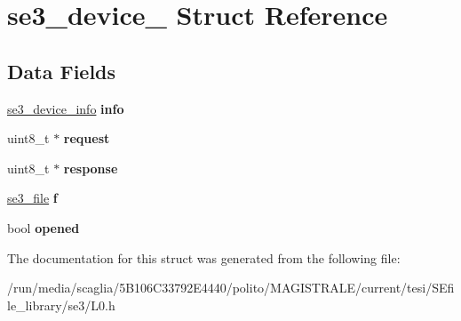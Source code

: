 \hypertarget{structse3__device__}{\section{se3\-\_\-device\-\_\- Struct Reference}
\label{structse3__device__}
}
\subsection*{Data Fields}
\begin{DoxyCompactItemize}
\item 
\hypertarget{structse3__device___acf59c445ad16d93a42ef4778d3cd9f5b}{\hyperlink{structse3__device__info__}{se3\-\_\-device\-\_\-info} {\bfseries info}}\label{structse3__device___acf59c445ad16d93a42ef4778d3cd9f5b}

\item 
\hypertarget{structse3__device___aaeb84a611ba0db8bc4731e53f9564b2e}{uint8\-\_\-t $\ast$ {\bfseries request}}\label{structse3__device___aaeb84a611ba0db8bc4731e53f9564b2e}

\item 
\hypertarget{structse3__device___a04f5fc8e98e6e4fa9577257495b9866d}{uint8\-\_\-t $\ast$ {\bfseries response}}\label{structse3__device___a04f5fc8e98e6e4fa9577257495b9866d}

\item 
\hypertarget{structse3__device___a36e8f9b6bafc4b5db5d8a18e67b6d088}{\hyperlink{structse3__file}{se3\-\_\-file} {\bfseries f}}\label{structse3__device___a36e8f9b6bafc4b5db5d8a18e67b6d088}

\item 
\hypertarget{structse3__device___abda2d2ee92f3f74961b5d2fae3017159}{bool {\bfseries opened}}\label{structse3__device___abda2d2ee92f3f74961b5d2fae3017159}

\end{DoxyCompactItemize}


The documentation for this struct was generated from the following file\-:\begin{DoxyCompactItemize}
\item 
/run/media/scaglia/5\-B106\-C33792\-E4440/polito/\-M\-A\-G\-I\-S\-T\-R\-A\-L\-E/current/tesi/\-S\-Efile\-\_\-library/se3/L0.\-h\end{DoxyCompactItemize}
